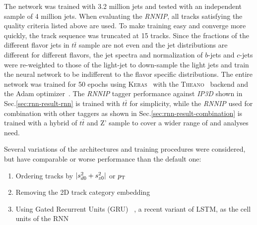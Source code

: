 The network was trained with 3.2 million jets and tested with an independent sample of 4 million jets. When evaluating the \textit{RNNIP}, all tracks satisfying the quality criteria listed above are used. To make training easy and converge more quickly, the track sequence was truncated at 15 tracks. Since the fractions of the different flavor jets in $t\bar t$ sample are not even and the jet \pt distributions are different for different flavors, the jet \pt spectra and normalization of $b$-jets and $c$-jets were re-weighted to those of the light-jet to down-sample the light jets and train the neural network to be indifferent to the flavor specific \pt distributions. The entire network was trained for 50 epochs using \textsc{Keras}~\cite{keras} with the \textsc{Theano}~\cite{theano} backend and the Adam optimizer~\cite{ref:ADAM}. The \textit{RNNIP} tagger performance against \textit{IP3D} shown in Sec.\ref{sec:rnn-result-rnn} is trained with $t\bar{t}$ for simplicity, while the \textit{RNNIP} used for combination with other taggers as shown in Sec.\ref{sec:rnn-result-combination} is trained with a hybrid of $t\bar{t}$ and Z' sample to cover a wider range of \pt and analyses need.

Several variations of the architectures and training procedures were considered, but have comparable or worse performance than the default one:
\begin{enumerate}
\item Ordering tracks by $|s_{d0}^2 + s_{z0}^2|$ or $p_{{\rm T}}$
\item Removing the 2D track category embedding
\item Using Gated Recurrent Units (GRU) ~\cite{ref:GRU,cho14}, a recent variant of LSTM, as the cell units of the RNN
 
\end{enumerate}

